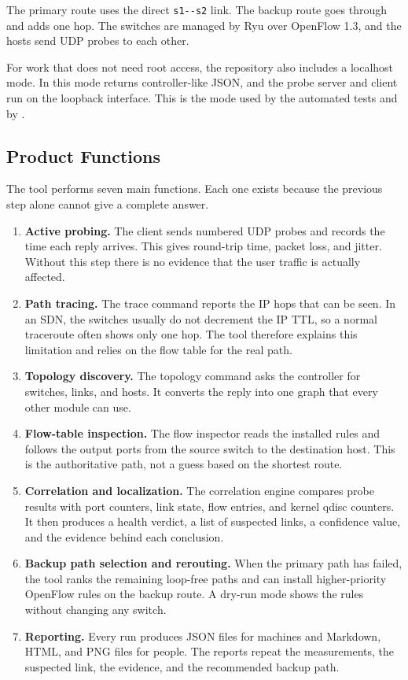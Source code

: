 \documentclass[11pt,a4paper]{article}
\newcommand{\code}[1]{\texttt{\detokenize{#1}}}
\begin{document}
The primary route uses the direct \verb|s1--s2| link. The backup route goes through \code{s3} and adds one hop. The switches are managed by Ryu over OpenFlow 1.3, and the hosts send UDP probes to each other.

For work that does not need root access, the repository also includes a localhost mode. In this mode \code{mock_controller.py} returns controller-like JSON, and the probe server and client run on the loopback interface. This is the mode used by the automated tests and by \code{make demo}.

\subsection{Product Functions}
The tool performs seven main functions. Each one exists because the previous step alone cannot give a complete answer.

\begin{enumerate}
  \item \textbf{Active probing.} The client sends numbered UDP probes and records the time each reply arrives. This gives round-trip time, packet loss, and jitter. Without this step there is no evidence that the user traffic is actually affected.
  \item \textbf{Path tracing.} The trace command reports the IP hops that can be seen. In an SDN, the switches usually do not decrement the IP TTL, so a normal traceroute often shows only one hop. The tool therefore explains this limitation and relies on the flow table for the real path.
  \item \textbf{Topology discovery.} The topology command asks the controller for switches, links, and hosts. It converts the reply into one graph that every other module can use.
  \item \textbf{Flow-table inspection.} The flow inspector reads the installed rules and follows the output ports from the source switch to the destination host. This is the authoritative path, not a guess based on the shortest route.
  \item \textbf{Correlation and localization.} The correlation engine compares probe results with port counters, link state, flow entries, and kernel qdisc counters. It then produces a health verdict, a list of suspected links, a confidence value, and the evidence behind each conclusion.
  \item \textbf{Backup path selection and rerouting.} When the primary path has failed, the tool ranks the remaining loop-free paths and can install higher-priority OpenFlow rules on the backup route. A dry-run mode shows the rules without changing any switch.
  \item \textbf{Reporting.} Every run produces JSON files for machines and Markdown, HTML, and PNG files for people. The reports repeat the measurements, the suspected link, the evidence, and the recommended backup path.
\end{enumerate}
\end{document}
